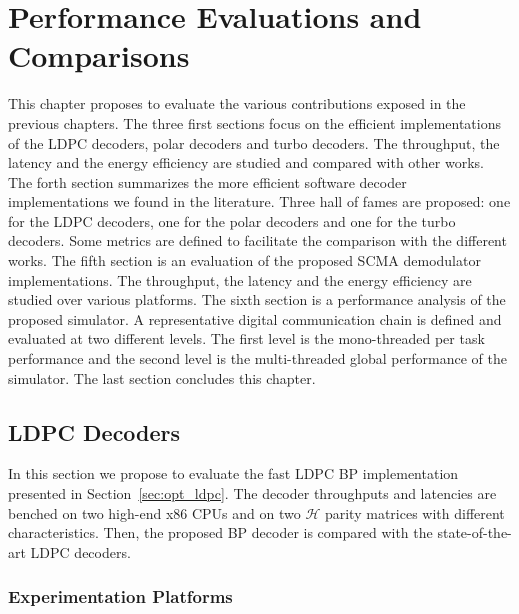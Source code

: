 
\renewcommand{\curChapter}{main/chapter4}

\chapter{Performance Evaluations and Comparisons}
\label{chap:eval}

This chapter proposes to evaluate the various contributions exposed in the
previous chapters. The three first sections focus on the efficient
implementations of the LDPC decoders, polar decoders and turbo decoders. The
throughput, the latency and the energy efficiency are studied and compared with
other works. The forth section summarizes the more efficient software decoder
implementations we found in the literature. Three hall of fames are proposed:
one for the LDPC decoders, one for the polar decoders and one for the turbo
decoders. Some metrics are defined to facilitate the comparison with the
different works. The fifth section is an evaluation of the proposed SCMA
demodulator implementations. The throughput, the latency and the energy
efficiency are studied over various platforms. The sixth section is a
performance analysis of the proposed \AFFECT simulator. A representative digital
communication chain is defined and evaluated at two different levels. The first
level is the mono-threaded per task performance and the second level is the
multi-threaded global performance of the simulator. The last section concludes
this chapter.

\vspace*{\fill}
\minitoccustom
\vspace*{\fill}

\newpage
\section{LDPC Decoders}
\label{sec:eval_ldpc}

In this section we propose to evaluate the fast LDPC BP implementation presented
in Section~\ref{sec:opt_ldpc}. The decoder throughputs and latencies are benched
on two high-end x86 CPUs and on two $\mathcal{H}$ parity matrices with different
characteristics. Then, the proposed BP decoder is compared with the
state-of-the-art LDPC decoders.

\subsection{Experimentation Platforms}

